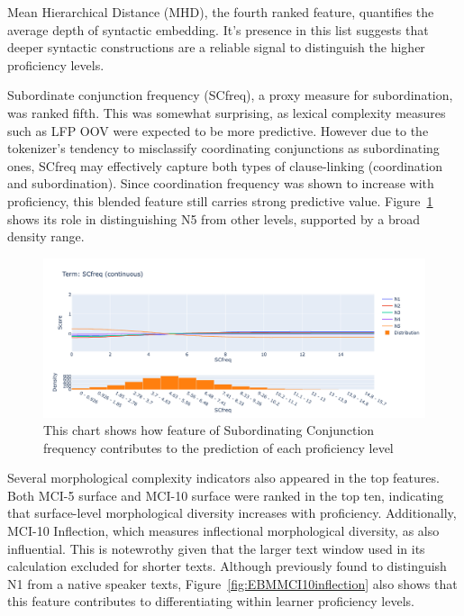 Mean Hierarchical Distance (MHD), the fourth ranked feature, quantifies the average depth of syntactic embedding.
It's presence in this list suggests that deeper syntactic constructions are a reliable signal to distinguish the
higher proficiency levels.

Subordinate conjunction frequency (SCfreq), a proxy measure for subordination, was ranked fifth. This was somewhat
surprising, as lexical complexity measures such as LFP OOV were expected to be more predictive. However due to the
tokenizer's tendency to misclassify coordinating conjunctions as subordinating ones, SCfreq may effectively capture
both types of clause-linking (coordination and subordination). Since coordination frequency was shown to increase
with proficiency, this blended feature still carries strong predictive value. Figure~\ref{fig:EBMSCfreq} shows its
role in distinguishing N5 from other levels, supported by a broad density range.

\begin{figure}[h!]
    \centering
    \includegraphics[scale=.4]{img/EBM/EBMSCfreq}
    \caption[Contribution of Subordinating Conjuction Frequency]{This chart shows how feature of Subordinating Conjunction frequency contributes to the prediction of each proficiency level}
    \label{fig:EBMSCfreq}
\end{figure}

Several morphological complexity indicators also appeared in the top features. Both MCI-5 surface and MCI-10
surface were ranked in the top ten, indicating that surface-level morphological diversity increases with
proficiency. Additionally, MCI-10 Inflection, which measures inflectional morphological diversity, as also
influential. This is notewrothy given that the larger text window used in its calculation excluded for shorter
texts. Although previously found to distinguish N1 from a native speaker texts, Figure~\ref{fig:EBMMCI10inflection}
also shows that this feature contributes to differentiating within learner proficiency levels.

